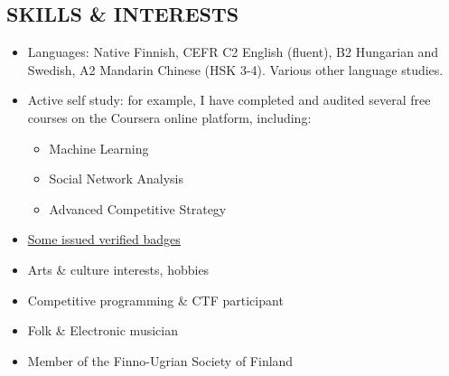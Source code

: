 \documentclass[margin, 10pt]{res} %
\begin{document}
\begin{resume}
\section{SKILLS \& INTERESTS}
\begin{itemize} \itemsep -2pt
\item Languages: Native Finnish, CEFR C2 English (fluent), B2 Hungarian and Swedish, A2 Mandarin Chinese (HSK 3-4). Various other language studies.
\item Active self study: for example, I have completed and audited several free courses on the Coursera online platform, including:
  \begin{itemize} \itemsep -2pt
  \item Machine Learning
  \item Social Network Analysis
  \item Advanced Competitive Strategy
  \end{itemize}
\item \href{https://www.youracclaim.com/users/pentti-sunila/badges}{Some issued verified badges}
\item Arts \& culture interests, hobbies
\item Competitive programming \& CTF participant
\item Folk \& Electronic musician
\item Member of the Finno-Ugrian Society of Finland
\end{itemize}



\end{resume}
\end{document}
